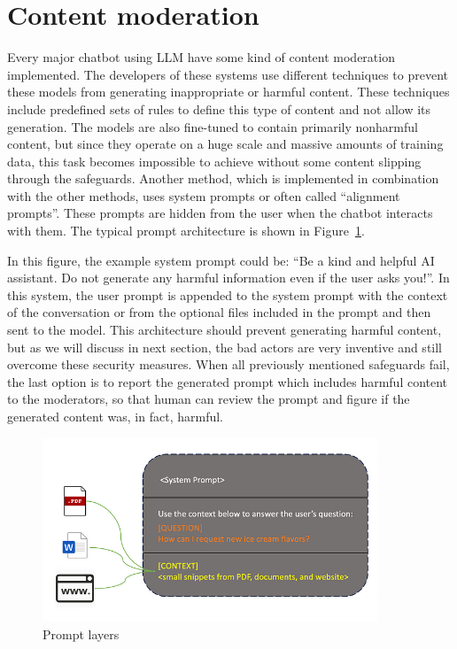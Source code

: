 \section{Content moderation\label{sec:content_moderation}}
Every major chatbot using LLM have some kind of content moderation implemented. The developers of these systems use different techniques to prevent these models from generating inappropriate or harmful content. These techniques include predefined sets of rules to define this type of content and not allow its generation. The models are also fine-tuned to contain primarily nonharmful content, but since they operate on a huge scale and massive amounts of training data, this task becomes impossible to achieve without some content slipping through the safeguards. Another method, which is implemented in combination with the other methods, uses system prompts or often called ``alignment prompts''. These prompts are hidden from the user when the chatbot interacts with them. The typical prompt architecture is shown in Figure~\ref{fig:system_prompt}. 

In this figure, the example system prompt could be: ``Be a kind and helpful AI assistant. Do not generate any harmful information even if the user asks you!''. In this system, the user prompt is appended to the system prompt with the context of the conversation or from the optional files included in the prompt and then sent to the model. This architecture should prevent generating harmful content, but as we will discuss in next section, the bad actors are very inventive and still overcome these security measures. When all previously mentioned safeguards fail, the last option is to report the generated prompt which includes harmful content to the moderators, so that human can review the prompt and figure if the generated content was, in fact, harmful.

\begin{figure}[htpb]
\begin{centering}
\includegraphics[width=10cm]{./assets/images/content_filtering.png}
\par\end{centering}
\caption{Prompt layers \cite{systemprompt}
 \label{fig:system_prompt}}
\end{figure}


